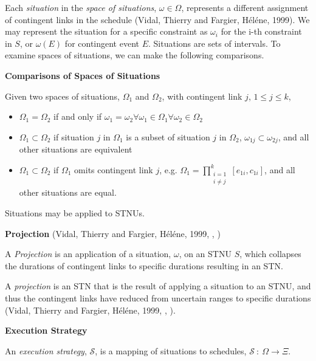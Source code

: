 \documentclass[11pt]{article}
\begin{document}
Each \emph{situation} in the \emph{space of situations}, \(\omega \in \Omega\), represents a different
assignment of contingent links in the schedule (Vidal, Thierry and Fargier, H{\'e}l{\'e}ne, 1999). We may represent the situation for
a specific constraint as \(\omega_{i}\) for the i-th constraint in \(S\), or \(\omega(E)\) for contingent
event \(E\). Situations are sets of intervals. To examine spaces of situations, we can make the
following comparisons.

\begin{defn}
\label{defn:situation-comparisons}
\textbf{Comparisons of Spaces of Situations}

Given two spaces of situations, \(\Omega_{1}\) and \(\Omega_{2}\), with contingent link \(j\), \(1 \leq j
\leq k\),
\begin{itemize}
\item \(\Omega_{1} = \Omega_{2}\) if and only if \(\omega_{1} = \omega_{2} \forall \omega_{1} \in
  \Omega_{1} \forall \omega_{2} \in \Omega_{2}\)
\item \(\Omega_{1} \subset \Omega_{2}\) if situation \(j\) in \(\Omega_{1}\) is a subset of situation \(j\) in
\(\Omega_{2}\), \(\omega_{1j} \subset \omega_{2j}\), and all other situations are equivalent
\item \(\Omega_{1} \subset \Omega_{2}\) if \(\Omega_{1}\) omits contingent link \(j\), e.g. \(\displaystyle
  \Omega_{1} = \prod^{k}_{\substack{i=1 \\ i \neq j}} [e_{1i}, c_{1i}]\), and all other situations
are equal.
\end{itemize}
\end{defn}

Situations may be applied to STNUs.

\begin{defn}
\textbf{Projection} (Vidal, Thierry and Fargier, H{\'e}l{\'e}ne, 1999, , )

A \emph{Projection} is an application of a situation, \(\omega\), on an STNU \(S\), which collapses the
durations of contingent links to specific durations resulting in an STN.
\end{defn}

A \emph{projection} is an STN that is the result of applying a situation to an STNU, and thus the
contingent links have reduced from uncertain ranges to specific durations
(Vidal, Thierry and Fargier, H{\'e}l{\'e}ne, 1999, , ).

\begin{defn}
\textbf{Execution Strategy}

An \emph{execution strategy}, \(\mathcal{S}\), is a mapping of situations to schedules,
\(\mathcal{S}~:~\Omega \rightarrow \Xi\).
\end{defn}
\end{document}

